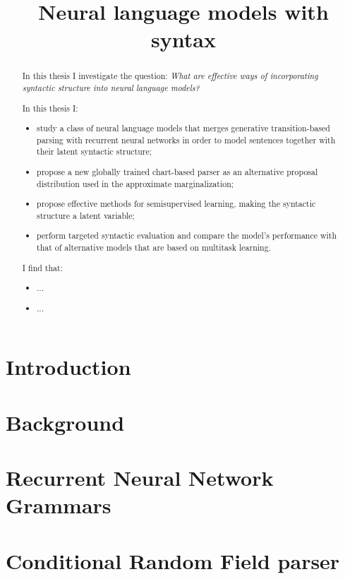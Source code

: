 \documentclass[examplefnt,biber]{../src/nowfnt} %
\title{Neural language models with syntax}
\begin{document}
\makeabstracttitle

\begin{abstract}
In this thesis I investigate the question: \textit{What are effective ways of incorporating syntactic structure into neural language models?}

In this thesis I:
\begin{itemize}
  \item study a class of neural language models that merges generative transition-based parsing with recurrent neural networks in order to model sentences together with their latent syntactic structure;
  \item propose a new globally trained chart-based parser as an alternative proposal distribution used in the approximate marginalization;
  \item propose effective methods for semisupervised learning, making the syntactic structure a latent variable;
  \item perform targeted syntactic evaluation and compare the model's performance with that of alternative models that are based on multitask learning.
\end{itemize}
I find that:
\begin{itemize}
  \item ...
  \item ...
\end{itemize}
\end{abstract}


\chapter{Introduction}
\label{01-introduction}



\chapter{Background}
\label{02-background}



\chapter{Recurrent Neural Network Grammars}
\label{03-rnng}



\chapter{Conditional Random Field parser}
\label{04-crf}

\end{document}
